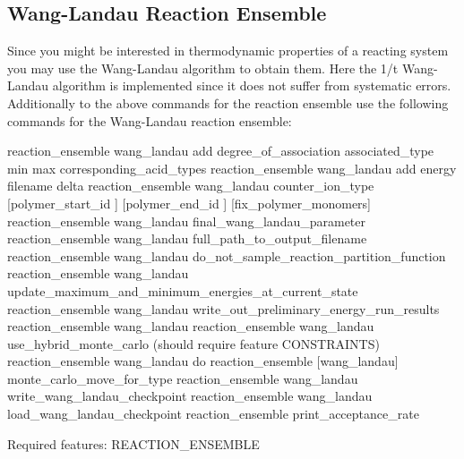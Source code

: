 \subsection{Wang-Landau Reaction Ensemble}
  Since you might be interested in thermodynamic properties of a reacting system you may use the Wang-Landau algorithm\cite{wang01a} to obtain them. Here the 1/t Wang-Landau algorithm\cite{belardinelli07a} is implemented since it does not suffer from systematic errors.
  Additionally to the above commands for the reaction ensemble use the following commands for the Wang-Landau reaction ensemble:
  \begin{essyntax}
   reaction\_ensemble wang_landau add degree\_of\_association associated\_type  min  max  corresponding\_acid\_types 
   reaction\_ensemble wang\_landau add energy filename  delta 
   reaction\_ensemble wang\_landau counter\_ion\_type  [polymer\_start\_id ] [polymer\_end\_id ] [fix_polymer_monomers] 
   reaction\_ensemble wang\_landau final\_wang\_landau\_parameter 
   reaction\_ensemble wang\_landau full\_path\_to\_output\_filename 
   reaction\_ensemble wang\_landau do\_not\_sample\_reaction\_partition\_function
   reaction\_ensemble wang\_landau update\_maximum\_and\_minimum\_energies\_at\_current\_state
   reaction\_ensemble wang\_landau write\_out\_preliminary\_energy\_run\_results 
   reaction_ensemble wang_landau 
     reaction\_ensemble wang\_landau use\_hybrid\_monte\_carlo (should require feature CONSTRAINTS)
   reaction\_ensemble wang\_landau do
   reaction\_ensemble [wang\_landau] monte\_carlo\_move\_for\_type 
   reaction\_ensemble wang\_landau write\_wang\_landau\_checkpoint 
   reaction\_ensemble wang\_landau load\_wang\_landau\_checkpoint 
   reaction\_ensemble print\_acceptance\_rate
  
  Required features: REACTION\_ENSEMBLE
\end{essyntax}

